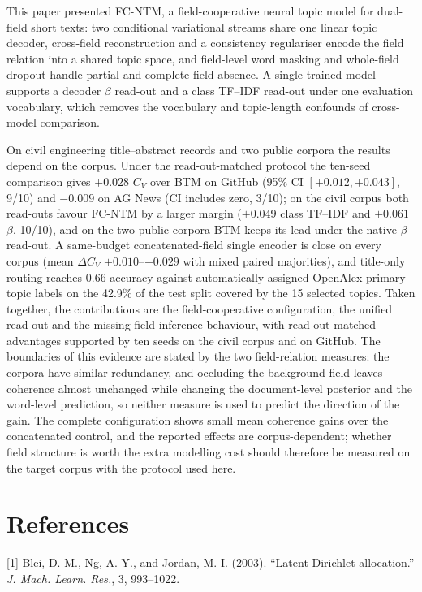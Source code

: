 \documentclass{article}
\begin{document}
This paper presented FC-NTM, a field-cooperative neural topic model for dual-field short texts:
two conditional variational streams share one linear topic decoder, cross-field reconstruction and a
consistency regulariser encode the field relation into a shared topic space, and field-level word
masking and whole-field dropout handle partial and complete field absence. A single trained model
supports a decoder $\beta$ read-out and a class TF--IDF read-out under one evaluation vocabulary,
which removes the vocabulary and topic-length confounds of cross-model comparison.

On civil engineering title--abstract records and two public corpora the results depend on the
corpus. Under the read-out-matched protocol the ten-seed comparison gives $+0.028$ $C_V$ over BTM on
GitHub (95\% CI $[+0.012,+0.043]$, 9/10) and $-0.009$ on AG News (CI includes zero, 3/10); on the
civil corpus both read-outs favour FC-NTM by a larger margin ($+0.049$ class TF--IDF and
$+0.061$ $\beta$, 10/10), and on the two public corpora BTM keeps its lead under the native $\beta$ read-out. A same-budget concatenated-field single encoder is close on every corpus (mean
$\Delta C_V$ $+0.010$--$+0.029$ with mixed paired majorities), and title-only routing reaches
0.66 accuracy against automatically assigned OpenAlex primary-topic labels on the 42.9\% of the test
split covered by the 15 selected topics. Taken together, the contributions are the field-cooperative configuration, the unified read-out
and the missing-field inference behaviour, with read-out-matched advantages supported by ten seeds on
the civil corpus and on GitHub. The boundaries of this evidence are stated by the two field-relation
measures: the corpora have similar redundancy, and occluding the background field leaves coherence
almost unchanged while changing the document-level posterior and the word-level prediction, so neither
measure is used to predict the direction of the gain. The complete configuration shows small mean
coherence gains over the concatenated control, and the reported effects are corpus-dependent;
whether field structure is worth the extra modelling cost should therefore be measured on the
target corpus with the protocol used here.

\section*{References}

[1] Blei, D. M., Ng, A. Y., and Jordan, M. I. (2003). ``Latent {Dirichlet} allocation.'' \emph{J. Mach. Learn. Res.}, 3, 993--1022.
\end{document}

